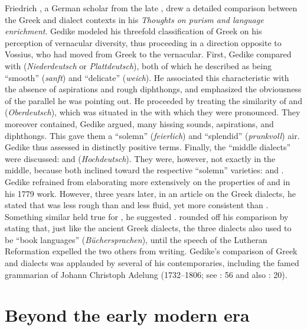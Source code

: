 Friedrich \citet[\textsc{xx}]{Gedike1779}, a German scholar from the late , drew a detailed comparison between the Greek and  dialect contexts in his \textit{Thoughts on purism and language enrichment}. Gedike modeled his threefold classification of Greek on his perception of vernacular  diversity, thus proceeding in a direction opposite to Vossius, who had moved from Greek to the vernacular. First, Gedike compared  with  (\textit{Niederdeutsch} or \textit{Plattdeutsch}), both of which he described as being “smooth” (\textit{sanft}) and “delicate” (\textit{weich}). He associated this characteristic with the absence of aspirations and rough diphthongs, and emphasized the obviousness of the parallel he was pointing out. He proceeded by treating the similarity of  and  (\textit{Oberdeutsch}), which was situated in the  with which they were pronounced. They moreover contained, Gedike argued, many hissing sounds, aspirations, and diphthongs. This gave them a “solemn” (\textit{feierlich}) and “splendid” (\textit{prunkvoll}) air. Gedike thus assessed  in distinctly positive terms. Finally, the “middle dialects” were discussed:  and  (\textit{Hochdeutsch}). They were, however, not exactly in the middle, because both inclined toward the respective “solemn” varieties:  and . Gedike refrained from elaborating more extensively on the properties of  and  in his 1779 work. However, three years later, in an article on the Greek dialects, he stated that  was less rough than  and less fluid, yet more consistent than . Something similar held true for , he suggested \citep[25]{Gedike1782}. \citet[\textsc{xx–xxi}]{Gedike1779} rounded off his comparison by stating that, just like the ancient Greek dialects, the three  dialects also used to be “book languages” (\textit{Büchersprachen}), until the  speech of the Lutheran Reformation expelled the two others from writing. Gedike’s comparison of Greek and  dialects was applauded by several of his contemporaries, including the famed grammarian of  Johann Christoph Adelung (1732–1806; see \citealt{Adelung1781}: 56 and also \citealt{Moritz1781}: 20).

\section{Beyond the early modern era}\label{sec:7.4}



